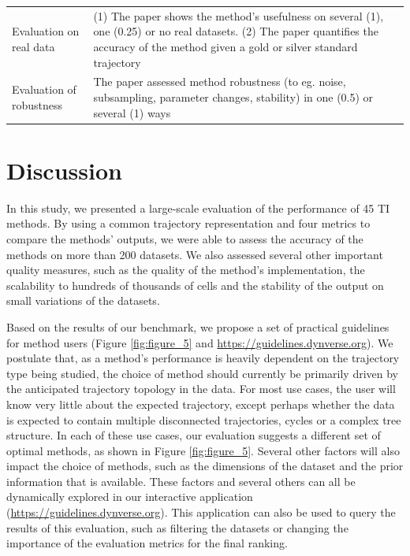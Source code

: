 \begin{table}[tbh!]
\begin{tabular}{p{2.5cm}p{8cm}p{1.5cm}}
		Evaluation on real data & (1) The paper shows the method's usefulness on several (1), one (0.25) or no real datasets. (2) The paper quantifies the accuracy of the method given a gold or silver standard trajectory & \cite{aniba_issuesbioinformaticsbenchmarking_2010,jelizarow_overoptimismbioinformaticsillustration_2010}\\*
		
		Evaluation of robustness & The paper assessed method robustness (to eg. noise, subsampling, parameter changes, stability) in one (0.5) or several (1) ways & \cite{karimzadeh_topconsiderationscreating_2018,aniba_issuesbioinformaticsbenchmarking_2010,boulesteix_tensimplerules_2015,jelizarow_overoptimismbioinformaticsillustration_2010}\\
		
		\bottomrule
	\end{tabular}
	\endgroup{}
\end{table}


\section{Discussion}

In this study, we presented a large-scale evaluation of the performance of 45 TI methods. By using a common trajectory representation and four metrics to compare the methods’ outputs, we were able to assess the accuracy of the methods on more than 200 datasets. We also assessed several other important quality measures, such as the quality of the method’s implementation, the scalability to hundreds of thousands of cells and the stability of the output on small variations of the datasets.

Based on the results of our benchmark, we propose a set of practical guidelines for method users (Figure \ref{fig:figure_5} and \url{https://guidelines.dynverse.org}). We postulate that, as a method’s performance is heavily dependent on the trajectory type being studied, the choice of method should currently be primarily driven by the anticipated trajectory topology in the data. For most use cases, the user will know very little about the expected trajectory, except perhaps whether the data is expected to contain multiple disconnected trajectories, cycles or a complex tree structure. In each of these use cases, our evaluation suggests a different set of optimal methods, as shown in Figure \ref{fig:figure_5}. Several other factors will also impact the choice of methods, such as the dimensions of the dataset and the prior information that is available. These factors and several others can all be dynamically explored in our interactive application (\url{https://guidelines.dynverse.org}). This application can also be used to query the results of this evaluation, such as filtering the datasets or changing the importance of the evaluation metrics for the final ranking.

